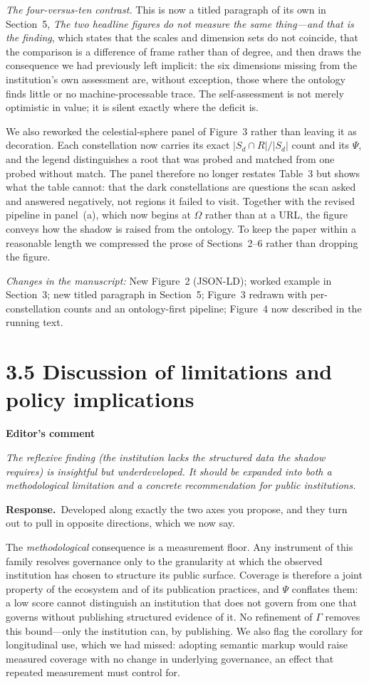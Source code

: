 \documentclass[11pt,a4paper]{article}
\newenvironment{comment}[1]
  {\par\vspace{6pt}\noindent\textbf{#1}\par\vspace{2pt}%
   \begin{mdframed}[backgroundcolor=cmtbg, linecolor=cmtrule, linewidth=0.6pt,
     innertopmargin=5pt, innerbottommargin=5pt, innerleftmargin=7pt,
     innerrightmargin=7pt, skipabove=2pt, skipbelow=5pt]\itshape}
  {\end{mdframed}}
\newcommand{\respuesta}{\par\noindent\textbf{Response.}\ }
\newcommand{\changed}[1]{\par\vspace{3pt}\noindent\textit{Changes in the manuscript:} #1\par}
\begin{document}
\emph{The four-versus-ten contrast.} This is now a titled paragraph of its own in Section~5, \emph{The two headline figures do not measure the same thing---and that is the finding}, which states that the scales and dimension sets do not coincide, that the comparison is a difference of frame rather than of degree, and then draws the consequence we had previously left implicit: the six dimensions missing from the institution's own assessment are, without exception, those where the ontology finds little or no machine-processable trace. The self-assessment is not merely optimistic in value; it is silent exactly where the deficit is.

We also reworked the celestial-sphere panel of Figure~3 rather than leaving it as decoration. Each constellation now carries its exact $|S_d\cap R|/|S_d|$ count and its $\Psi$, and the legend distinguishes a root that was probed and matched from one probed without match. The panel therefore no longer restates Table~3 but shows what the table cannot: that the dark constellations are questions the scan asked and answered negatively, not regions it failed to visit. Together with the revised pipeline in panel~(a), which now begins at $\Omega$ rather than at a URL, the figure conveys how the shadow is raised from the ontology. To keep the paper within a reasonable length we compressed the prose of Sections~2--6 rather than dropping the figure.

\changed{New Figure~2 (JSON-LD); worked example in Section~3; new titled paragraph in Section~5; Figure~3 redrawn with per-constellation counts and an ontology-first pipeline; Figure~4 now described in the running text.}

\section*{3.5 Discussion of limitations and policy implications}

\begin{comment}{Editor's comment}
The reflexive finding (the institution lacks the structured data the shadow requires) is insightful but underdeveloped. It should be expanded into both a methodological limitation and a concrete recommendation for public institutions.
\end{comment}

\respuesta Developed along exactly the two axes you propose, and they turn out to pull in opposite directions, which we now say.

The \emph{methodological} consequence is a measurement floor. Any instrument of this family resolves governance only to the granularity at which the observed institution has chosen to structure its public surface. Coverage is therefore a joint property of the ecosystem and of its publication practices, and $\Psi$ conflates them: a low score cannot distinguish an institution that does not govern from one that governs without publishing structured evidence of it. No refinement of $\Gamma$ removes this bound---only the institution can, by publishing. We also flag the corollary for longitudinal use, which we had missed: adopting semantic markup would raise measured coverage with no change in underlying governance, an effect that repeated measurement must control for.
\end{document}
